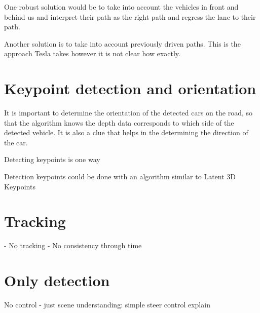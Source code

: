 One robust solution would be to take into account the vehicles in front and
behind us and interpret their path as the right path and regress the lane to
their path. 

Another solution is to take into account previously driven paths. This is the
approach Tesla takes however it is not clear how exactly.

\section{Keypoint detection and orientation}

It is important to determine the orientation of the detected cars on the road,
so that the algorithm knows the depth data corresponds to which side of the
detected vehicle. It is also a clue that helps in the determining the direction
of the car.

Detecting keypoints is one way

Detection keypoints could be done with an algorithm similar to Latent 3D Keypoints\cite{suwajanakorn_discovery_2018}

\section{Tracking}
- No tracking
- No consistency through time
\section{Only detection}

No control - just scene understanding:
simple steer control explain